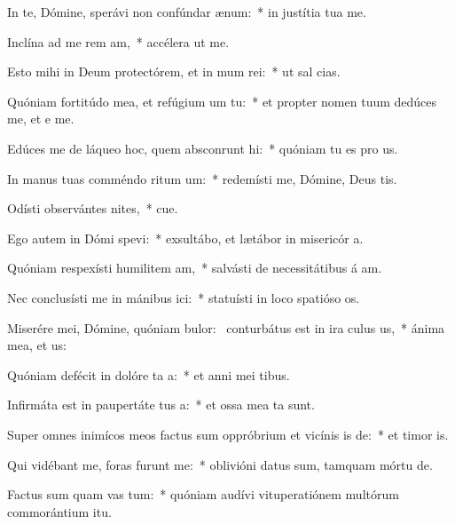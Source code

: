 \item In te, Dómine, sperávi non confúndar  ænum:~* in justítia tua  me.
\item Inclína ad me rem am,~* accélera ut  me.
\item Esto mihi in Deum protectórem, et in mum rei:~* ut sal  cias.
\item Quóniam fortitúdo mea, et refúgium um  tu:~* et propter nomen tuum dedúces me, et e me.
\item Edúces me de láqueo hoc, quem absconrunt hi:~* quóniam tu es pro us.
\item In manus tuas comméndo ritum um:~* redemísti me, Dómine, Deus tis.
\item Odísti observántes nites,~* cue.
\item Ego autem in Dómi spevi:~* exsultábo, et lætábor in misericór a.
\item Quóniam respexísti humilitem am,~* salvásti de necessitátibus á am.
\item Nec conclusísti me in mánibus ici:~* statuísti in loco spatióso  os.
\item Miserére mei, Dómine, quóniam bulor:~\pscross{} conturbátus est in ira culus us,~* ánima mea, et  us:
\item Quóniam defécit in dolóre ta a:~* et anni mei  tibus.
\item Infirmáta est in paupertáte tus a:~* et ossa mea ta sunt.
\item Super omnes inimícos meos factus sum oppróbrium et vicínis is de:~* et timor  is.
\item Qui vidébant me, foras furunt  me:~* oblivióni datus sum, tamquam mórtu  de.
\item Factus sum quam vas tum:~* quóniam audívi vituperatiónem multórum commorántium  itu.

